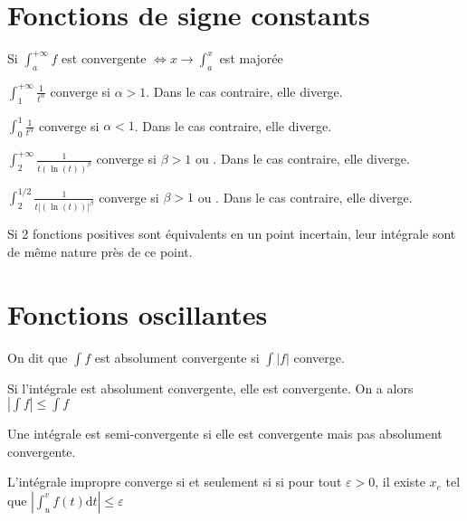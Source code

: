 \documentclass[french]{yLectureNote}
\newcommand{\dd}[0]{\mathrm{d}}
\begin{document}
\section{Fonctions de signe constants}
\begin{proposition}
Si \(\int^{+\infty}_af\) est convergente \(\iff x\to \int^x_a\) est majorée
\end{proposition}
\begin{proposition}
\(\int^{+\infty}_1\frac{1}{t^{\alpha}}\) converge si \(\alpha > 1\). Dans le cas contraire, elle diverge.
\end{proposition}
\begin{proposition}
\(\int^{1}_0\frac{1}{t^{\alpha}}\) converge si \(\alpha < 1\). Dans le cas contraire, elle diverge.
\end{proposition}
\begin{proposition}
\(\int^{+\infty}_2\frac{1}{t(\ln(t))^{\beta}}\) converge si \(\beta > 1\) ou . Dans le cas contraire, elle diverge.
\end{proposition}
\begin{proposition}
\(\int^{1/2}_2\frac{1}{t|(\ln(t))|^{\beta}}\) converge si \(\beta > 1\) ou . Dans le cas contraire, elle diverge.
\end{proposition}
\begin{proposition}
Si 2 fonctions positives sont équivalents en un point incertain, leur intégrale sont de m\^eme nature près de ce point.
\end{proposition}
\section{Fonctions oscillantes}
\begin{definition}
On dit que \(\int f\) est absolument convergente si \(\int |f|\) converge.
\end{definition}
\begin{theorem}
 Si l'intégrale est absolument convergente, elle est convergente. On a alors \(|\int f|\leq \int f\)
\end{theorem}
\begin{definition}
Une intégrale est semi-convergente si elle est convergente mais pas absolument convergente.
\end{definition}
\begin{theorem}
 L'intégrale impropre converge si et seulement si si pour tout \(\varepsilon >0\), il existe \(x_e\) tel que \(|\int_u^vf(t)\dd t|\leq \varepsilon\)
\end{theorem}
\end{document}
